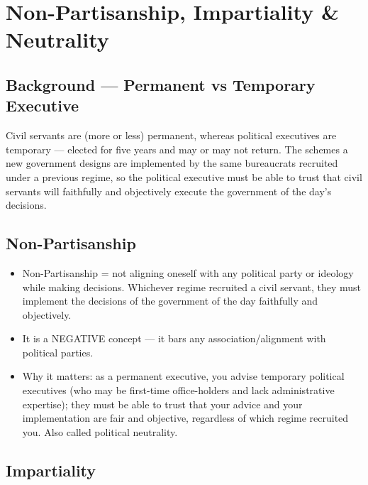 \section{Non-Partisanship, Impartiality \& Neutrality}

\subsection{Background --- Permanent vs Temporary Executive}

Civil servants are (more or less) permanent, whereas political executives are temporary --- elected for five years and may or may not return. The schemes a new government designs are implemented by the same bureaucrats recruited under a previous regime, so the political executive must be able to trust that civil servants will faithfully and objectively execute the government of the day's decisions.

\subsection{Non-Partisanship}

\begin{KeyConcept}
\begin{itemize}
\item Non-Partisanship = not aligning oneself with any political party or ideology while making decisions. Whichever regime recruited a civil servant, they must implement the decisions of the government of the day faithfully and objectively.
\item It is a NEGATIVE concept --- it bars any association/alignment with political parties.
\end{itemize}
\end{KeyConcept}

\begin{itemize}
\item Why it matters: as a permanent executive, you advise temporary political executives (who may be first-time office-holders and lack administrative expertise); they must be able to trust that your advice and your implementation are fair and objective, regardless of which regime recruited you. Also called political neutrality.
\end{itemize}

\subsection{Impartiality}

